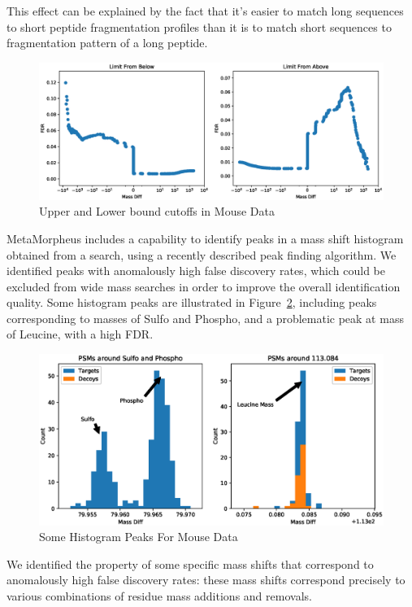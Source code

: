 \documentclass[journal=jprobs,manuscript=article]{achemso}
\begin{document}
This effect can be explained by the fact that it's easier to match long sequences to short peptide fragmentation profiles than it is to match short sequences to fragmentation pattern of a long peptide.

\begin{figure}
\caption{Upper and Lower bound cutoffs in Mouse Data}
\label{fig:figure2-upperlowerbounds}
\includegraphics[scale=0.5]{figure_2-upperlowerbounds}
\end{figure}


MetaMorpheus includes a capability to identify peaks in a mass shift histogram obtained from a search, using a recently described peak finding algorithm\cite{Rodriguez_2014}. We identified peaks with anomalously high false discovery rates, which could be excluded from wide mass searches in order to improve the overall identification quality. Some histogram peaks are illustrated in Figure~\ref{fig:figure3}, including peaks corresponding to masses of Sulfo and Phospho, and a problematic peak at mass of Leucine, with a high FDR.


\begin{figure}
\caption{Some Histogram Peaks For Mouse Data}
\label{fig:figure3}
\includegraphics[scale=0.6]{figure_3peaks}
\end{figure}

We identified the property of some specific mass shifts that correspond to anomalously high false discovery rates: these mass shifts correspond precisely to various combinations of residue mass additions and removals.
\end{document}

